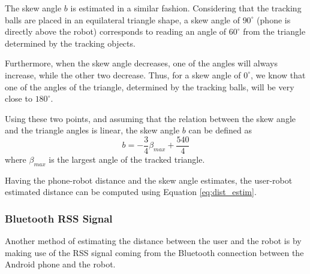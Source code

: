 \documentclass[journal]{IEEEtran}
\begin{document}
The skew angle $b$ is estimated in a similar fashion. Considering that the tracking balls are placed in an equilateral triangle shape, a skew angle of $90^{\circ}$ (phone is directly above the robot) corresponds to reading an angle of $60^{\circ}$ from the triangle determined by the tracking objects.

Furthermore, when the skew angle decreases, one of the angles will always increase, while the other two decrease. Thus, for a skew angle of $0^{\circ}$, we know that one of the angles of the triangle, determined by the tracking balls, will be very close to $180^{\circ}$.

Using these two points, and assuming that the relation between the skew angle and the triangle angles is linear, the skew angle $b$ can be defined as
\begin{equation}
b=-\frac{3}{4}\beta_{max}+\frac{540}{4}
\end{equation}
where $\beta_{max}$ is the largest angle of the tracked triangle.

Having the phone-robot distance and the skew angle estimates, the user-robot estimated distance can be computed using Equation \ref{eq:dist_estim}.

\subsubsection{Bluetooth RSS Signal}
Another method of estimating the distance between the user and the robot is by making use of the RSS signal coming from the Bluetooth connection between the Android phone and the robot.
\end{document}
